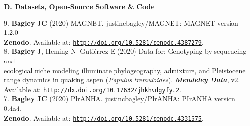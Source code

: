 \documentclass[margin,line]{res}
\begin{document}
\begin{resume}
\textbf{D. Datasets, Open-Source Software \& Code}%

9. \textbf{Bagley JC} (2020) MAGNET. justincbagley/MAGNET: MAGNET version 1.2.0.\\ \vspace{2mm}
\hspace*{8mm}\textbf{Zenodo}. Available at: \href{http://doi.org/10.5281/zenodo.4387279}{\tt http://doi.org/10.5281/zenodo.4387279}. \\
8. \textbf{Bagley J}, Heming N, Guti\'{e}rrez E (2020) Data for: Genotyping-by-sequencing and \\
\hspace*{8mm} ecological niche modeling illuminate phylogeography, admixture, and Pleistocene\\ %
\hspace*{8mm} range dynamics in quaking aspen (\textit{Populus tremuloides}). {\it \textbf{Mendeley Data}}, v2.\\ \vspace{2mm}
\hspace*{8mm}Available at: \href{http://dx.doi.org/10.17632/jhkhvdgyfy.2}{\tt http://dx.doi.org/10.17632/jhkhvdgyfy.2}. \\
7. \textbf{Bagley JC} (2020) PIrANHA. justincbagley/PIrANHA: PIrANHA version 0.4a4.\\ 
\vspace{2mm}
\hspace*{8mm} \textbf{Zenodo}. Available at: \href{http://doi.org/10.5281/zenodo.4331675}{\tt http://doi.org/10.5281/zenodo.4331675}. \\

\end{resume}
\end{document}

